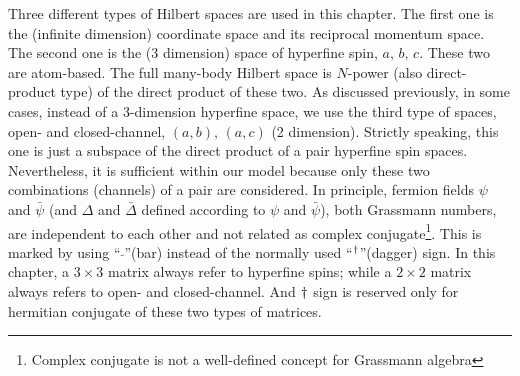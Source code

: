 Three different types of Hilbert spaces are used in this chapter.   The first one is the  (infinite dimension) coordinate space and its reciprocal momentum space.   The second one is the  (3 dimension) space of hyperfine spin, $a,\,b,\,c$.   These two are atom-based.  The full many-body Hilbert space is $N$-power (also direct-product type) of the direct product of these two.  As discussed previously, in some cases, instead of a 3-dimension hyperfine space, we use the third type of spaces, open- and closed-channel, $(a,b),\,(a,c)$ (2 dimension).  Strictly speaking, this one is just a subspace of the direct product of a pair hyperfine spin spaces.  Nevertheless,  it is sufficient within our model because only these two combinations (channels) of a pair are considered.    In principle, fermion fields $\psi$ and $\bar\psi$ (and $\Delta$ and $\bar\Delta$ defined according to $\psi$ and $\bar\psi$),  both Grassmann numbers, are independent to each other  and  not related as complex conjugate\footnote{Complex conjugate is not a well-defined concept for Grassmann algebra}.  This is marked by using ``$\bar{\;}$''(bar) instead of the normally used ``$^{\dagger}$''(dagger) sign. In this chapter, a $3\times3$ matrix always refer to hyperfine spins; while a $2\times2$ matrix always refers to  open- and closed-channel.  And $^{}\dagger$ sign  is reserved only for hermitian conjugate of these two types of matrices. 

